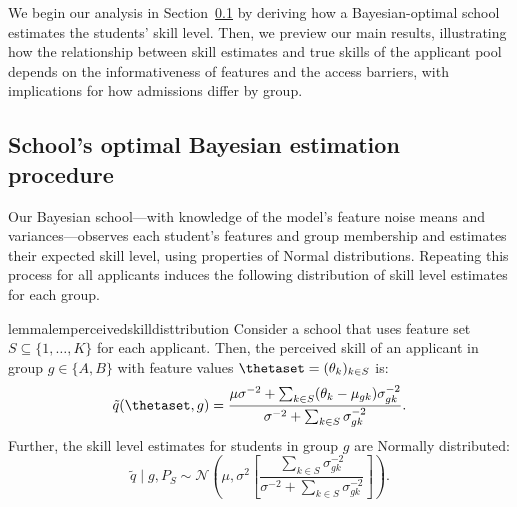 We begin our analysis in Section~\ref{sec:skillestimation} by deriving how a Bayesian-optimal school estimates the students' skill level.
Then,
we preview our main results, illustrating how the relationship between skill estimates and true skills of the applicant pool depends on the informativeness  of features and the access barriers, with implications for how admissions differ by group.

\subsection{School's optimal Bayesian estimation procedure}

\label{sec:skillestimation}

Our Bayesian school---with knowledge of the model's feature noise means and variances---observes each student's features and group membership and estimates their expected skill level, using properties of Normal distributions. Repeating this process for all applicants induces the following distribution of skill level estimates for each group.

\begin{restatable}{lemma}{lemperceivedskilldisttribution}
	\label{lemma:perceived_skill_distribution}
	Consider a school that uses feature set $S \subseteq \{1, \dots, K\}$ for each applicant.
 {Then, the perceived skill of an applicant in group $g\in\{A,B\}$ with feature values $\thetaset = (\theta_k)_{k\in S}$ is:}
 \begin{equation}
 \label{eq:skill_estimate}
	\tilde q(\thetaset, g) =
	\frac{\mu \sigma^{-2} + \sum_{{k\in S}}(\theta_{k} - \mu_{gk})\sigma_{gk}^{-2}} {\sigma^{-2} +\sum_{{k\in S}} \sigma_{gk}^{-2}}.
 \end{equation}
Further, the skill level estimates for students in group $g$ are Normally distributed:
\begin{equation}
\label{eq:estimate_distribution_group}
	{\tilde q \mid  g, P_{S}} \sim \mathcal{N}  \left( \mu, \sigma^{2}\left[\frac{\sum_{{k\in S}} \sigma_{gk}^{-2}  }{\sigma^{-2} +\sum_{{k\in S}} \sigma_{gk}^{-2}}\right]\right).
\end{equation}
\end{restatable}



